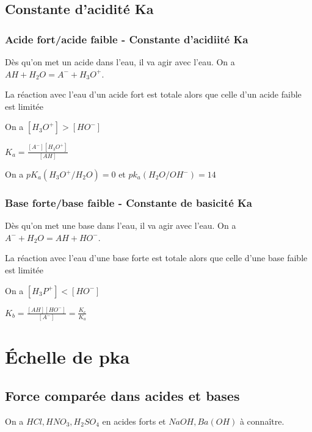 \documentclass[french]{yLectureNote}
\begin{document}
\subsection{Constante d'acidité Ka}
\subsubsection{Acide fort/acide faible - Constante d'acidiité Ka}
Dès qu'on met un acide dans l'eau, il va agir avec l'eau. On a \(AH+H_2O = A^-+H_3O^+\).

\begin{definition}
La réaction avec l'eau d'un acide fort est totale alors que celle d'un acide faible est limitée
\end{definition}
\begin{definition}
On a \([H_3O^+]>[HO^-]\)
\end{definition}
\begin{definition}
\(K_a = \frac{[A^-][H_3O^+]}{[AH]}\)
\end{definition}
On a \(pK_a (H_3O^+/H_2O) = 0\) et \(pk_a(H_2O/OH^-) = 14\)
\subsubsection{Base forte/base faible - Constante de basicité Ka}
Dès qu'on met une base dans l'eau, il va agir avec l'eau. On a \(A^-+H_2O = AH+HO^-\).

\begin{definition}
La réaction avec l'eau d'une base forte est totale alors que celle d'une base faible est limitée
\end{definition}
\begin{definition}
On a \([H_3P^+]<[HO^-]\)
\end{definition}
\begin{definition}
\(K_b = \frac{[AH][HO^-]}{[A^-]} = \frac{K_e}{K_a}\)
\end{definition}
\section{Échelle de pka}
\subsection{Force comparée dans acides et bases}
\begin{proposition}
On a \(HCl,HNO_3, H_2SO_4\) en acides forts et \(NaOH, Ba(OH)\) à conna\^itre.
\end{proposition}
\end{document}
